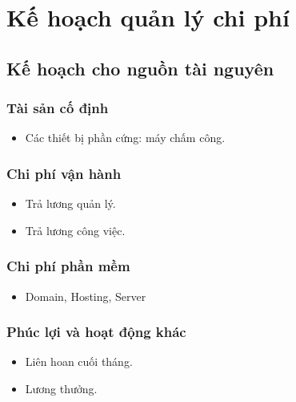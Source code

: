 \section{Kế hoạch quản lý chi phí}
\subsection{Kế hoạch cho nguồn tài nguyên}
\subsubsection{Tài sản cố định}
\begin{itemize}
    \item Các thiết bị phần cứng: máy chấm công.
\end{itemize}

\subsubsection{Chi phí vận hành}
\begin{itemize}
    \item Trả lương quản lý.
    \item Trả lương công việc.
\end{itemize}

\subsubsection{Chi phí phần mềm}
\begin{itemize}
    \item Domain, Hosting, Server
\end{itemize}

\subsubsection{Phúc lợi và hoạt động khác}
\begin{itemize}
    \item Liên hoan cuối tháng.
    \item Lương thưởng.
\end{itemize}

